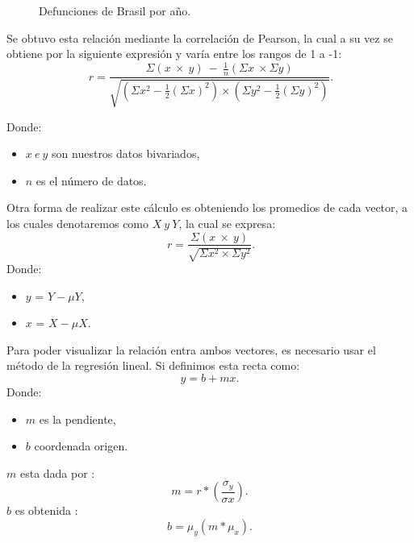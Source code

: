 \documentclass[12pt]{article}
\begin{document}
\begin{figure}[H]
%
\hfill
\caption{Defunciones de Brasil por año.}
\label{fig:casoBrasil}
\end{figure}


Se obtuvo esta relación mediante la correlación de Pearson, la cual a su vez se obtiene por la siguiente expresión y varía entre los rangos de 1 a -1:
\[\ r = \frac{\Sigma\left(x\ \times\ y\right)\ -\ \frac{1}{n}\left(\Sigma x\ \times\Sigma y\right)}{\sqrt{\left(\Sigma x^2-\frac{1}{2}\left(\Sigma x\right)^2\right)\times\left(\Sigma y^2-\frac{1}{2}\left(\Sigma y\right)^2\right)}}.\]

Donde:
\begin{itemize}
	\item $x\ e\ y$ son nuestros datos bivariados,
	\item $n$ es el número de datos.
\end{itemize}
Otra forma de realizar este cálculo es obteniendo  los promedios de cada vector, a los cuales denotaremos como $X\ y\ Y$, la cual se expresa:
\[\ r =  \frac{\Sigma\left(x\ \times\ y\right)}{\sqrt{\Sigma x^2\times\Sigma y^2}}.\]
Donde:
\begin{itemize}
	\item $y$ = $Y - \mu Y$,
	\item $x$ = $X - \mu X$.
\end{itemize}
Para poder visualizar la relación entra ambos vectores, es necesario usar el método de la regresión lineal. Si definimos esta recta como:
\[ y = b + mx .\]
Donde:
\begin{itemize}
	\item $m$ es la pendiente,
	\item $b$ coordenada origen.
\end{itemize}
$m$ esta dada por :
\[ m = r * (\frac{\sigma_{y}}{\sigma{x}}).\]
$b$ es obtenida :
\[ b = \mu_{y}(m * \mu_{x}).\]
\end{document}
